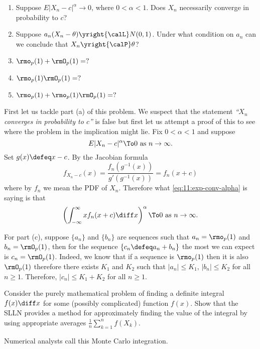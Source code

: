 \begin{problem}[DasGupta 7.2 (a), (b), (c), (d), (e)]
  \begin{enumerate}[label=(\alph*),noitemsep]
  \item Suppose \(E|X_n-c|^\alpha\to 0\), where \(0<\alpha<1\). Does
    \(X_n\) necessarily converge in probability to \(c\)?
  \item Suppose \(a_n(X_n-\theta)\yright{\calL}N(0,1)\). Under what
    condition on \(a_n\) can we conclude that \(X_n\yright{\calP}\theta\)?
  \item \(\rmo_p(1)+\rmO_p(1)=?\)
  \item \(\rmo_p(1)\rmO_p(1)=?\)
  \item \(\rmo_p(1)+\rmo_p(1)\rmO_p(1)=?\)
  \end{enumerate}
\end{problem}
\begin{solution}
  First let us tackle part (a) of this problem. We suspect that the
  statement \textsl{``\(X_n\) converges in probability to \(c\)''} is false
  but first let us attempt a proof of this to see where the problem in the
  implication might lie. Fix \(0<\alpha<1\) and suppose
  \begin{equation}
    \label{eq:11:exp-conv-alpha}
    E|X_n-c|^\alpha
    \To 0%
    \text{ as \(n\to\infty\).}
  \end{equation}
  Set \(g(x)\defeq x-c\). By the Jacobian formula
  \[
    f_{X_n-c}(x)=\frac{f_n(g^{-1}(x))}{g'(g^{-1}(x))}=f_n(x+c)
  \]
  where by \(f_n\) we mean the PDF of \(X_n\). Therefore what
  \eqref{eq:11:exp-conv-alpha} is saying is that
  \[
    \left(\int_{-\infty}^\infty xf_n(x+c)\diff x\right)^\alpha
    \To 0\text{ as \(n\to\infty\).}
  \]

  For part (c), suppose \(\{a_n\}\) and \(\{b_n\}\) are sequences such that
  \(a_n=\rmo_p(1)\) and \(b_n=\rmO_p(1)\), then for the sequence
  \(\{c_n\defeq a_n+b_n\}\) the most we can expect is
  \(c_n=\rmO_p(1)\). Indeed, we know that if a sequence is \(\rmo_p(1)\)
  then it is also \(\rmO_p(1)\) therefore there exists \(K_1\) and \(K_2\)
  such that \(|a_n|\leq K_1\), \(|b_n|\leq K_2\) for all \(n\geq
  1\). Therefore, \(|c_n|\leq K_1+K_2\) for all \(n\geq 1\).
\end{solution}
\newpage

\begin{problem}
  Consider the purely mathematical problem of finding a definite integral
  \(f(x)\diff x\) for some (possibly complicated) function \(f(x)\). Show
  that the SLLN provides a method for approximately finding the value of
  the integral by using appropriate averages
  \(\frac{1}{n}\sum_{k=1}^n f(X_k)\).

  Numerical analysts call this Monte Carlo integration.
\end{problem}
\begin{solution}

\end{solution}
\newpage

